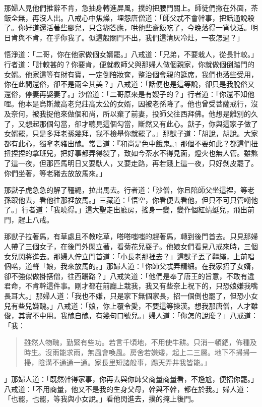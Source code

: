 那婦人見他們推辭不肯，急抽身轉進屏風，撲的把腰門關上。師徒們撇在外面，茶飯全無，再沒人出。八戒心中焦燥，埋怨唐僧道：「師父忒不會幹事，把話通說殺了。你好道還活著些腳兒，只含糊答應，哄他些齋飯吃了，今晚落得一宵快活。明日肯與不肯，在乎你我了。似這般關門不出，我們這清灰冷灶，一夜怎過？」

悟淨道：「二哥，你在他家做個女婿罷。」八戒道：「兄弟，不要栽人，從長計較。」行者道：「計較甚的？你要肯，便就教師父與那婦人做個親家，你就做個倒踏門的女婿。他家這等有財有寶，一定倒陪妝奩，整治個會親的筵席，我們也落些受用，你在此間還俗，卻不是兩全其美？」八戒道：「話便也是這等說，卻只是我脫俗又還俗，停妻再娶妻了。」沙僧道：「二哥原來是有嫂子的？」行者道：「你還不知他哩。他本是烏斯藏高老兒莊高太公的女婿，因被老孫降了。他也曾受菩薩戒行，沒及奈何，被我捉他來做個和尚，所以棄了前妻，投師父往西拜佛。他想是離別的久了，又想起那個勾當，卻才聽見這個勾當，斷然又有此心。獃子，你與這家子做了女婿罷，只是多拜老孫幾拜，我不檢舉你就罷了。」那獃子道：「胡說，胡說。大家都有此心，獨拿老豬出醜。常言道：『和尚是色中餓鬼。』那個不要如此？都這們扭扭捏捏的拿班兒，把好事都弄得裂了，致如今茶水不得見面，燈火也無人管。雖熬了這一夜，但那匹馬明日又要馱人，又要走路，再若餓上這一夜，只好剝皮罷了。你們坐著，等老豬去放放馬來。」

那獃子虎急急的解了韁繩，拉出馬去。行者道：「沙僧，你且陪師父坐這裡，等老孫跟他去，看他往那裡放馬。」三藏道：「悟空，你看便去看他，但只不可只管嘲他了。」行者道：「我曉得。」這大聖走出廳房，搖身一變，變作個紅蜻蜓兒，飛出前門，趕上八戒。

那獃子拉著馬，有草處且不教吃草，嗒嗒嗤嗤的趕著馬，轉到後門首去。只見那婦人帶了三個女子，在後門外閑立著，看菊花兒耍子。他娘女們看見八戒來時，三個女兒閃將進去。那婦人佇立門首道：「小長老那裡去？」這獃子丟了韁繩，上前唱個喏，道聲「娘，我來放馬的。」那婦人道：「你師父忒弄精細。在我家招了女婿，卻不強似做掛搭僧，往西蹡路？」八戒笑道：「他們是奉了唐王的旨意，不敢有違君命，不肯幹這件事。剛才都在前廳上栽我，我又有些奈上祝下的，只恐娘嫌我嘴長耳大。」那婦人道：「我也不嫌，只是家下無個家長，招一個倒也罷了，但恐小女兒有些兒嫌醜。」八戒道：「娘，你上覆令愛，不要這等揀漢。想我那唐僧，人才雖俊，其實不中用。我醜自醜，有幾句口號兒。」婦人道：「你怎的說麼？」八戒道：「我：
\begin{quote}
雖然人物醜，勤緊有些功。若言千頃地，不用使牛耕。只消一頓鈀，佈種及時生。沒雨能求雨，無風會喚風。房舍若嫌矮，起上二三層。地下不掃掃一掃，陰溝不通通一通。家長里短諸般事，踢天弄井我皆能。」
\end{quote}

」那婦人道：「既然幹得家事，你再去與你師父商量商量看，不尷尬，便招你罷。」八戒道：「不用商量，他又不是我的生身父母，幹與不幹，都在於我。」婦人道：「也罷，也罷，等我與小女說。」看他閃進去，撲的掩上後門。

